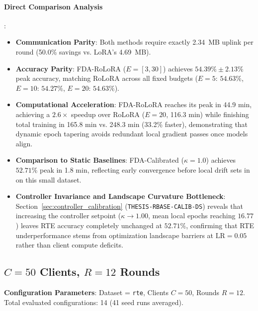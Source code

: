 \documentclass[10pt,a4paper]{article}
\begin{document}
\paragraph{Direct Comparison Analysis}:
\begin{itemize}
    \item \textbf{Communication Parity}: Both methods require exactly 2.34~MB uplink per round (50.0\% savings vs. LoRA's 4.69~MB).
    \item \textbf{Accuracy Parity}: FDA-RoLoRA ($E=[3, 30]$) achieves $54.39\% \pm 2.13\%$ peak accuracy, matching RoLoRA across all fixed budgets ($E=5$: $54.63\%$, $E=10$: $54.27\%$, $E=20$: $54.63\%$).
    \item \textbf{Computational Acceleration}: FDA-RoLoRA reaches its peak in 44.9 min, achieving a $2.6\times$ speedup over RoLoRA ($E=20$, 116.3 min) while finishing total training in 165.8 min vs. 248.3 min (33.2\% faster), demonstrating that dynamic epoch tapering avoids redundant local gradient passes once models align.
    \item \textbf{Comparison to Static Baselines}: FDA-Calibrated ($\kappa=1.0$) achieves $52.71\%$ peak in 1.8 min, reflecting early convergence before local drift sets in on this small dataset.
    \item \textbf{Controller Invariance and Landscape Curvature Bottleneck}: Section~\ref{sec:controller_calibration} (\texttt{THESIS-RBASE-CALIB-DS}) reveals that increasing the controller setpoint ($\kappa \to 1.00$, mean local epochs reaching $16.77$) leaves RTE accuracy completely unchanged at $52.71\%$, confirming that RTE underperformance stems from optimization landscape barriers at $\mathrm{LR}=0.05$ rather than client compute deficits.
\end{itemize}


\clearpage
\subsection{\texorpdfstring{$C=50$ Clients, $R=12$ Rounds}{C=50 Clients, R=12 Rounds}}

\textbf{Configuration Parameters}: Dataset = \texttt{rte}, Clients $C = 50$, Rounds $R = 12$. Total evaluated configurations: 14 (41 seed runs averaged).
\end{document}
